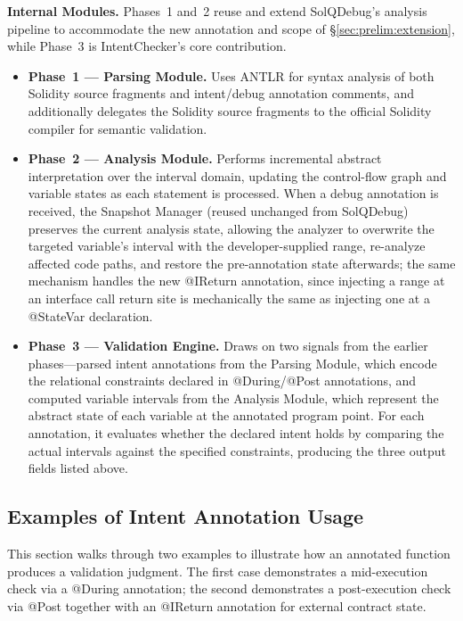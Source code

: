 \documentclass[pdflatex,sn-basic]{sn-jnl}%
\theoremstyle{thmstyleone}%
\theoremstyle{thmstyletwo}%
\theoremstyle{thmstylethree}%
\begin{document}
\smallskip
\noindent\textbf{Internal Modules.}
Phases~1 and~2 reuse and extend SolQDebug's analysis pipeline to accommodate the new annotation and scope of §\ref{sec:prelim:extension}, while Phase~3 is IntentChecker's core contribution.
\begin{itemize}
    \item \textbf{Phase~1 --- Parsing Module.} Uses ANTLR for syntax analysis of both Solidity source fragments and intent/debug annotation comments, and additionally delegates the Solidity source fragments to the official Solidity compiler for semantic validation.
    \item \textbf{Phase~2 --- Analysis Module.} Performs incremental abstract interpretation over the interval domain, updating the control-flow graph and variable states as each statement is processed. When a debug annotation is received, the Snapshot Manager (reused unchanged from SolQDebug) preserves the current analysis state, allowing the analyzer to overwrite the targeted variable's interval with the developer-supplied range, re-analyze affected code paths, and restore the pre-annotation state afterwards; the same mechanism handles the new @IReturn annotation, since injecting a range at an interface call return site is mechanically the same as injecting one at a @StateVar declaration.
    \item \textbf{Phase~3 --- Validation Engine.} Draws on two signals from the earlier phases---parsed intent annotations from the Parsing Module, which encode the relational constraints declared in @During/@Post annotations, and computed variable intervals from the Analysis Module, which represent the abstract state of each variable at the annotated program point. For each annotation, it evaluates whether the declared intent holds by comparing the actual intervals against the specified constraints, producing the three output fields listed above.
\end{itemize}

\subsection{Examples of Intent Annotation Usage}

This section walks through two examples to illustrate how an annotated function produces a validation judgment.
The first case demonstrates a mid-execution check via a @During annotation; the second demonstrates a post-execution check via @Post together with an @IReturn annotation for external contract state.
\end{document}
